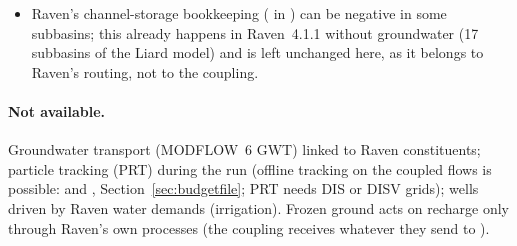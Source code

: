 \begin{itemize}
a non-Gregorian calendar; restarts and later starts refuse time-array series (TAS6), TVK6/TVS6, simulations with several
models and array or advanced packages with several period entries before the start (TS6 time series are shifted to Raven's
start); TDIS and water-mover period data given as  are refused ( files are read); the stream
package keeps the model's stage and has no conductance (supply) limit; undefined / are
taken as metres and days (set them in DIS and TDIS); monitoring wells and  need the cell outlines
( or , not ). Water-table ET,  and
 work as with a generated model.
\item Raven's channel-storage bookkeeping ( in ) can be negative in some subbasins; this
already happens in Raven~4.1.1 without groundwater (17 subbasins of the Liard model) and is left unchanged here, as it belongs
to Raven's routing, not to the coupling.

\end{itemize}
\paragraph{Not available.}
Groundwater transport (MODFLOW~6 GWT) linked to Raven constituents; particle tracking (PRT) during the run (offline tracking
on the coupled flows is possible:  and , Section~\ref{sec:budgetfile}; PRT
needs DIS or DISV grids); wells driven by Raven water demands (irrigation). Frozen ground acts on recharge only through Raven's own
processes (the coupling receives whatever they send to ).

